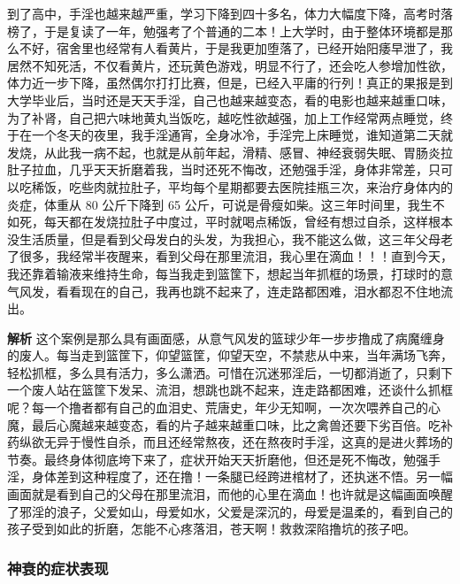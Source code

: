 \begin{case}[神经衰弱]
    到了高中，手淫也越来越严重，学习下降到四十多名，体力大幅度下降，高考时落榜了，于是复读了一年，勉强考了个普通的二本！上大学时，由于整体环境都是那么不好，宿舍里也经常有人看黄片，于是我更加堕落了，已经开始阳痿早泄了，我居然不知死活，不仅看黄片，还玩黄色游戏，明显不行了，还会吃人参增加性欲，体力近一步下降，虽然偶尔打打比赛，但是，已经入平庸的行列！真正的果报是到大学毕业后，当时还是天天手淫，自己也越来越变态，看的电影也越来越重口味，为了补肾，自己把六味地黄丸当饭吃，越吃性欲越强，加上工作经常两点睡觉，终于在一个冬天的夜里，我手淫通宵，全身冰冷，手淫完上床睡觉，谁知道第二天就发烧，从此我一病不起，也就是从前年起，滑精、感冒、神经衰弱失眠、胃肠炎拉肚子拉血，几乎天天折磨着我，当时还死不悔改，还勉强手淫，身体非常差，只可以吃稀饭，吃些肉就拉肚子，平均每个星期都要去医院挂瓶三次，来治疗身体内的炎症，体重从 80 公斤下降到 65 公斤，可说是骨瘦如柴。这三年时间里，我生不如死，每天都在发烧拉肚子中度过，平时就喝点稀饭，曾经有想过自杀，这样根本没生活质量，但是看到父母发白的头发，为我担心，我不能这么做，这三年父母老了很多，我经常半夜醒来，看到父母在那里流泪，我心里在滴血！！！直到今天，我还靠着输液来维持生命，每当我走到篮筐下，想起当年抓框的场景，打球时的意气风发，看看现在的自己，我再也跳不起来了，连走路都困难，泪水都忍不住地流出。

    \textbf{解析} 这个案例是那么具有画面感，从意气风发的篮球少年一步步撸成了病魔缠身的废人。每当走到篮筐下，仰望篮筐，仰望天空，不禁悲从中来，当年满场飞奔，轻松抓框，多么具有活力，多么潇洒。可惜在沉迷邪淫后，一切都消逝了，只剩下一个废人站在篮筐下发呆、流泪，想跳也跳不起来，连走路都困难，还谈什么抓框呢？每一个撸者都有自己的血泪史、荒唐史，年少无知啊，一次次喂养自己的心魔，最后心魔越来越变态，看的片子越来越重口味，比之禽兽还要下劣百倍。吃补药纵欲无异于慢性自杀，而且还经常熬夜，还在熬夜时手淫，这真的是进火葬场的节奏。最终身体彻底垮下来了，症状开始天天折磨他，但还是死不悔改，勉强手淫，身体差到这种程度了，还在撸！一条腿已经跨进棺材了，还执迷不悟。另一幅画面就是看到自己的父母在那里流泪，而他的心里在滴血！也许就是这幅画面唤醒了邪淫的浪子，父爱如山，母爱如水，父爱是深沉的，母爱是温柔的，看到自己的孩子受到如此的折磨，怎能不心疼落泪，苍天啊！救救深陷撸坑的孩子吧。
\end{case}

\subsubsection{神衰的症状表现}

